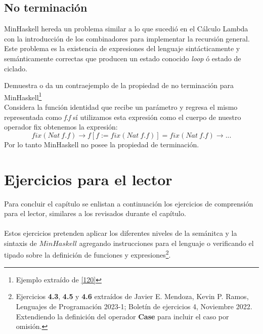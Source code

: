     \subsection{No terminación}
        \textsf{MinHaskell} hereda un problema similar a lo que sucedió en el Cálculo Lambda con la introducción de los combinadores para implementar la recursión general. Este problema es la existencia de expresiones del lenguaje sintácticamente y semánticamente correctas que producen un estado conocido \textit{loop} ó estado de ciclado.

        \begin{exercise}
            Demuestra o da un contraejemplo de la propiedad de no terminación para \textsf{MinHaskell}\footnote{Ejemplo extraído de \hyperlink{120}{[120]}}\\

            Considera la función identidad que recibe un parámetro y regresa el mismo representada como \textit{f.f} sí utilizamos esta expresión como el cuerpo de nuestro operador \textsf{fix} obtenemos la expresión:
            \[
                \textit{fix}(Nat\ f.f) \to f[f:=fix(Nat\ f.f)] = fix(Nat\ f.f)  \to ...
            \]
            Por lo tanto \textsf{MinHaskell} no posee la propiedad de terminación.
        \end{exercise}


\section{Ejercicios para el lector}

    Para concluir el capítulo se enlistan a continuación los ejercicios de comprensión para el lector, similares a los revisados durante el capítulo.\\\\
    Estos ejercicios pretenden aplicar los diferentes niveles de la semánitca y la sintaxis de $MinHaskell$ agregando instrucciones para el lenguaje o verificando el tipado sobre la definición de funciones y expresiones\footnote{Ejercicios \textbf{4.3}, \textbf{4.5} y \textbf{4.6} extraídos de Javier E. Mendoza, Kevin P. Ramos, Lenguajes de Programación 2023-1; Boletín de ejercicios 4, Noviembre 2022. Extendiendo la definición del operador \textbf{Case} para incluir el caso por omisión.}.

    \bigskip

